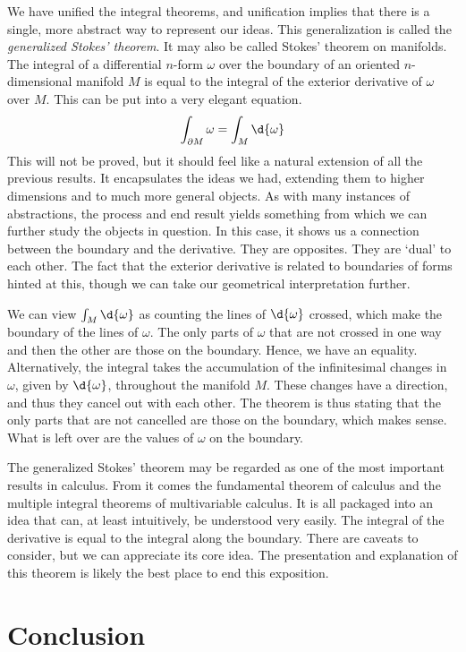 \documentclass[a4paper,12pt]{article}
\begin{document}
We have unified the integral theorems, and unification implies that there is a single, more abstract way to represent our ideas.
This generalization is called the \emph{generalized Stokes' theorem}.
It may also be called Stokes' theorem on manifolds.
The integral of a differential $n$-form $\omega$ over the boundary of an oriented $n$-dimensional manifold $M$ is equal to the integral of the exterior derivative of $\omega$ over $M$.
This can be put into a very elegant equation.
\begin{equation*}
    \int_{\partial M} \omega = \int_M \d{\omega}
\end{equation*}
This will not be proved, but it should feel like a natural extension of all the previous results.
It encapsulates the ideas we had, extending them to higher dimensions and to much more general objects.
As with many instances of abstractions, the process and end result yields something from which we can further study the objects in question.
In this case, it shows us a connection between the boundary and the derivative.
They are opposites.
They are `dual' to each other.
The fact that the exterior derivative is related to boundaries of forms hinted at this, though we can take our geometrical interpretation further.

We can view $\int_M \d{\omega}$ as counting the lines of $\d{\omega}$ crossed, which make the boundary of the lines of $\omega$.
The only parts of $\omega$ that are not crossed in one way and then the other are those on the boundary.
Hence, we have an equality.
Alternatively, the integral takes the accumulation of the infinitesimal changes in $\omega$, given by $\d{\omega}$, throughout the manifold $M$.
These changes have a direction, and thus they cancel out with each other.
The theorem is thus stating that the only parts that are not cancelled are those on the boundary, which makes sense.
What is left over are the values of $\omega$ on the boundary.

The generalized Stokes' theorem may be regarded as one of the most important results in calculus.
From it comes the fundamental theorem of calculus and the multiple integral theorems of multivariable calculus.
It is all packaged into an idea that can, at least intuitively, be understood very easily.
The integral of the derivative is equal to the integral along the boundary.
There are caveats to consider, but we can appreciate its core idea.
The presentation and explanation of this theorem is likely the best place to end this exposition.

\section{Conclusion}
\end{document}

